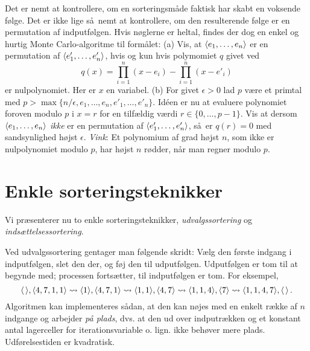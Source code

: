 \begin{exerc}[Resultatkontroll]
  Det er nemt at kontrollere, om en sorteringsmåde faktisk har skabt en voksende følge.
  Det er ikke lige så nemt at kontrollere, om den resulterende følge er en permutation af indputfølgen.
  Hvis nøglerne er heltal, findes der dog en enkel og hurtig Monte Carlo-algoritme
til formålet:
(a)
Vis, at $\langle e_1,\ldots,e_n\rangle$ er en permutation  af 
$\langle e'_1,\ldots,e'_n\rangle$, hvis og kun hvis polymomiet $q$ givet ved
  \[ q(x) = \prod_{i=1}^n(x-e_i)-\prod_{i=1}^n(x-e'_i)\]
  er nulpolynomiet. 
  Her er $x$ en variabel.
(b) For givet $\epsilon>0$ lad
$p$ være et primtal
  med
  $p>\max\{n/\epsilon,e_1,\ldots,e_n,e'_1,\ldots,e'_n\}$.
  Idéen er nu at evaluere polynomiet foroven modulo $p$ i $x=r$ for en tilfældig værdi
  $r\in\{0,\ldots, p-1\}$. 
  Vis at dersom $\langle e_1,\ldots,e_n\rangle$ \emph{ikke} er en permutation af  $\langle e'_1,\ldots,e'_n\rangle$,  så er $q(r)=0$ med sandsynlighed højst $\epsilon$.
\emph{Vink}: Et polynomium af grad højst $n$, som ikke er nulpolynomiet modulo $p$, har højst $n$ rødder, når man regner modulo $p$.
\end{exerc}


\section{Enkle sorteringsteknikker}

Vi præsenterer nu to enkle sorteringsteknikker, \emph{udvalgssortering} og \emph{indsættelsessortering}. 

%
Ved udvalgssortering
gentager man følgende skridt:
Vælg den første indgang i indputfølgen, slet den der, og føj den til udputfølgen.
Udputfølgen er tom til at begynde med;
processen fortsætter, til indputfølgen er tom.
For eksempel,
\[ \langle \,\rangle,\langle 4,7,1,1\rangle\leadsto
\langle 1\rangle,\langle 4,7,1\rangle\leadsto
\langle 1,1\rangle,\langle 4,7\rangle\leadsto
\langle 1,1,4\rangle,\langle 7\rangle\leadsto
\langle 1,1,4,7\rangle,\langle \,\rangle\,. \]
Algoritmen kan implementeres sådan, at den kan nøjes med en enkelt række af $n$ indgange og arbejder \emph{på plads},
dvs. at den ud over indputrækken og et konstant antal lagerceller for iterationsvariable o. lign. ikke behøver mere plads.
Udførelsestiden er kvadratisk.

